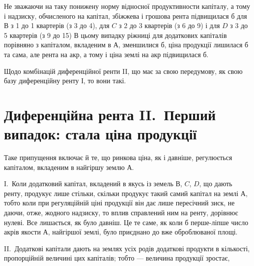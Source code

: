 \noindent{}Не зважаючи на таку понижену норму відносної продуктивности капіталу,
а тому і надзиску, обчисленого на капітал, збіжжева і грошова рента підвищилася
б для $В$ з 1 до 1 квартерів (з 3 до 4), для $C$ з 2 до 3 квартерів (з 6 до 9) і для $D$ з 3 до 5 квартерів (з 9 до 15)
В цьому випадку ріжниці для додаткових капіталів порівняно з капіталом,
вкладеним в $А$, зменшилися б, ціна продукції лишилася б та сама, але рента
на акр, а тому і ціна землі на акр підвищилася б.

Щодо комбінацій диференційної ренти II, що має за свою передумову, як
свою базу диференційну ренту І, то вони такі.

\section{Диференційна рента II.~Перший випадок: стала ціна продукції}

Таке припущення включає й те, що ринкова ціна, як і давніше, регулюється
капіталом, вкладеним в найгіршу землю $А$.

I.~Коли додатковий капітал, вкладений в якусь із земель $В$, $C$, $D$, що
дають ренту, продукує лише стільки, скільки продукує такий самий капітал на
землі $А$, тобто коли при регуляційній ціні продукції він дає лише пересічний
зиск, не даючи, отже, жодного надзиску, то вплив справлений ним на ренту, дорівнює
нулеві. Все лишається, як було давніш. Це те саме, як коли б перше-ліпше
число акрів якости $А$, найгіршої землі, було приєднано до вже оброблюваної
площі.

II.~Додаткові капітали дають на землях усіх родів додаткові продукти в кількості,
пропорційній величині цих капіталів; тобто — величина продукції зростає,
\parbreak{}  %
